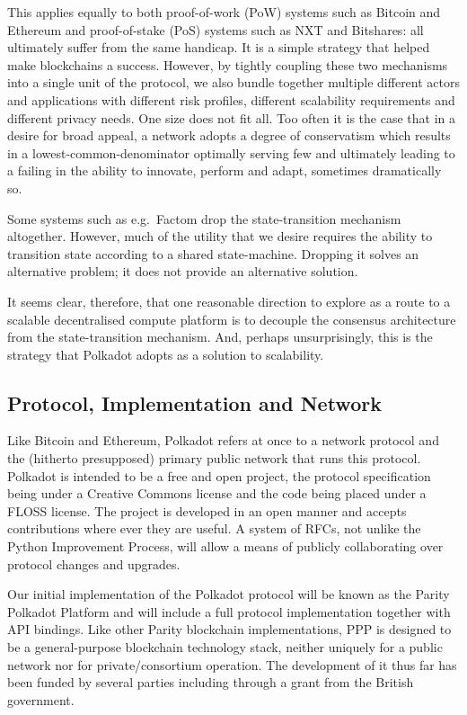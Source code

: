 \documentclass[9pt,oneside]{amsart}
\makeatletter
\newcommand*\eg{e.g.\@\xspace}
\makeatother
\begin{document}
\begin{multicols}{2}
This applies equally to both proof-of-work (PoW) systems such as Bitcoin\cite{nakamoto2008bitcoin} and Ethereum\cite{buterin2013whitepaper,wood2014yellow} and proof-of-stake (PoS) systems such as NXT\cite{nxt} and Bitshares\cite{bitshares}: all ultimately suffer from the same handicap. It is a simple strategy that helped make blockchains a success. However, by tightly coupling these two mechanisms into a single unit of the protocol, we also bundle together multiple different actors and applications with different risk profiles, different scalability requirements and different privacy needs. One size does not fit all. Too often it is the case that in a desire for broad appeal, a network adopts a degree of conservatism which results in a lowest-common-denominator optimally serving few and ultimately leading to a failing in the ability to innovate, perform and adapt, sometimes dramatically so.

Some systems such as \eg~Factom\cite{snow2014factom} drop the state-transition mechanism altogether. However, much of the utility that we desire requires the ability to transition state according to a shared state-machine. Dropping it solves an alternative problem; it does not provide an alternative solution.

 It seems clear, therefore, that one reasonable direction to explore as a route to a scalable decentralised compute platform is to decouple the consensus architecture from the state-transition mechanism. And, perhaps unsurprisingly, this is the strategy that Polkadot adopts as a solution to scalability.

\subsection{Protocol, Implementation and Network}\label{stack-versus-network}

 Like Bitcoin and Ethereum, Polkadot refers at once to a network protocol and the (hitherto presupposed) primary public network that runs this protocol. Polkadot is intended to be a free and open project, the protocol specification being under a Creative Commons license and the code being placed under a FLOSS license. The project is developed in an open manner and accepts contributions where ever they are useful. A system of RFCs, not unlike the Python Improvement Process, will allow a means of publicly collaborating over protocol changes and upgrades.

 Our initial implementation of the Polkadot protocol will be known as the Parity Polkadot Platform and will include a full protocol implementation together with API bindings. Like other Parity blockchain implementations, PPP is designed to be a general-purpose blockchain technology stack, neither uniquely for a public network nor for private/consortium operation. The development of it thus far has been funded by several parties including through a grant from the British government.


\end{multicols}
\end{document}
